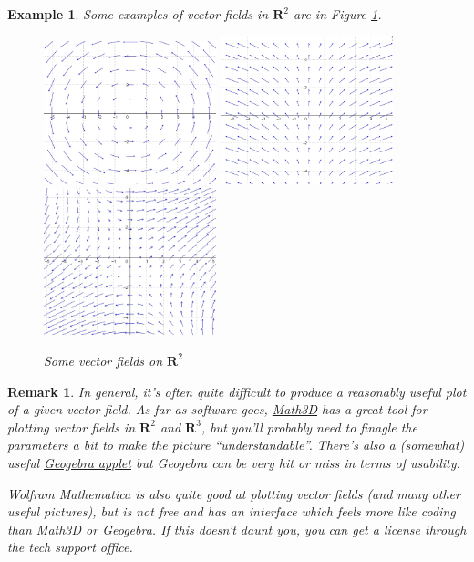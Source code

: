 \documentclass[12pt]{article}
\numberwithin{equation}{subsection}
\numberwithin{figure}{subsection}
\theoremstyle{note}
\newtheorem{example}[subsection]{Example}
\newtheorem{remark}[subsection]{Remark}
\newcommand{\R}{\mathbf{R}}
\begin{document}
{\begin{example}
\label{Ex-vf-R2} Some examples of vector fields in $\mathbf{R}^2$ are in Figure \ref{fig-ex-vf}.
\begin{figure}[h!] \centering 
\includegraphics[width=50mm]{Images/ws21-a} 
\quad \includegraphics[width=50mm]{Images/ws21-b}
\quad \includegraphics[width=50mm]{Images/ws21-d} 
\caption{Some vector fields on $\R^2$}
\label{fig-ex-vf}
\end{figure}
\end{example}

\begin{remark}In general, it's often quite difficult to produce a reasonably useful plot of a given vector field. As far as software goes, \href{https://www.math3d.org/}{Math3D} has a great tool for plotting vector fields in $\mathbf{R}^2$ and $\mathbf{R}^3$, but you'll probably need to finagle the parameters a bit to make the picture ``understandable''. There's also a (somewhat) useful \href{https://www.geogebra.org/m/QPE4PaDZ}{Geogebra applet} but Geogebra can be very hit or miss in terms of usability. 

Wolfram Mathematica is also quite good at plotting vector fields (and many other useful pictures), but is not free and has an interface which feels more like coding than Math3D or Geogebra. If this doesn't daunt you, you can get a license through the tech support office.  \end{remark}

}
\end{document}

